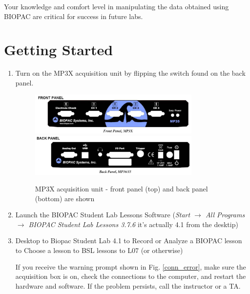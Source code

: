 \documentclass{article}
\begin{document}
\begin{info}
	Your knowledge and comfort level in manipulating the data obtained using BIOPAC are critical for success in future labs.
\end{info}

\section*{Getting Started}
\begin{enumerate}
	\item Turn on the MP3X acquisition unit by flipping the switch found on the back panel.
		\begin{figure}[h]
		\includegraphics[width=0.8\textwidth]{../images/BIOPAC_2a.jpg}
		\includegraphics[width=0.8\textwidth]{../images/BIOPAC_2b.jpg}
		\centering
		\caption{MP3X acquisition unit - front panel (top) and back panel (bottom) are shown}
		\label{panels}
		\end{figure}
		
	\item Launch the BIOPAC Student Lab Lessons Software (\textit{Start $\rightarrow$ All Programs $\rightarrow$ BIOPAC Student Lab Lessons 3.7.6} it's actually 4.1 from the desktip)
	\item Desktop to Biopac Student Lab 4.1 to Record or Analyze a BIOPAC lesson to Choose a lesson to BSL lessons to L07 (or otherwise)
	
	\begin{warn}
		If you receive the warning prompt shown in Fig. \ref{conn_error}, make sure the acquisition box is on, check the connections to the computer, and restart the hardware and software. If the problem persists, call the instructor or a TA.
	\end{warn}
	

\end{enumerate}
\end{document}
